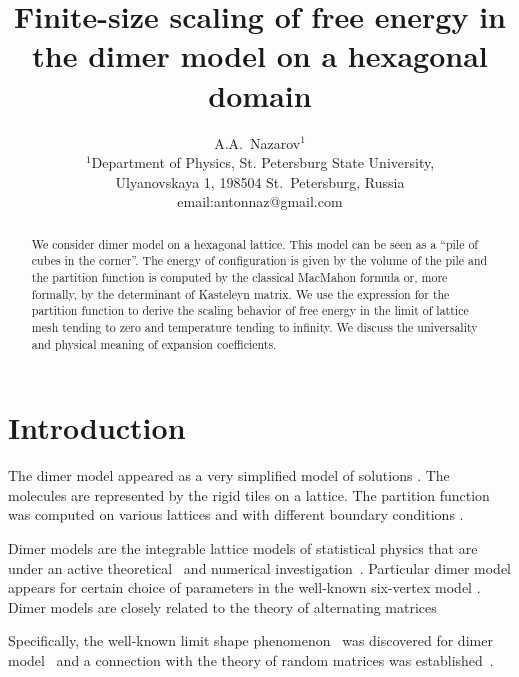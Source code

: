 \documentclass{article}
\begin{document}
\title{Finite-size scaling of free energy in the dimer model on a hexagonal domain}

\author{A.A.~Nazarov$^{1}$\\
{\small
  $^{1}$Department of Physics, St. Petersburg State University,} \\
{\small  Ulyanovskaya 1, 198504 St.~Petersburg, Russia}\\
\small{email:antonnaz@gmail.com}
}
\date{}
\maketitle

\begin{abstract}
  We consider dimer model on a hexagonal lattice. This model can be seen as a ``pile of cubes in the
  corner''. The energy of configuration is given by the volume of the pile and the partition
  function is computed by the classical MacMahon formula or, more formally, by the determinant of
  Kasteleyn matrix. We use the expression for the partition function to derive the scaling behavior
  of free energy in the limit of lattice mesh tending to zero and temperature tending to infinity.
  We discuss the universality and physical meaning of expansion coefficients.
\end{abstract}


\section*{Introduction}
\label{sec:introduction}
The dimer model appeared as a very simplified model of solutions \cite{Fowler-1937}. The molecules
are represented by the rigid tiles on a lattice. The partition function was computed on various
lattices and with different boundary conditions \cite{doi:10.1080/14786436108243366,
  P.W-1961,kenyon2009lectures}.

Dimer models are the integrable lattice models of statistical physics that are under an active
theoretical~\cite{zj2000,ferrari} and numerical
investigation~\cite{ks2018}. Particular dimer model appears for certain choice
of parameters in the well-known six-vertex model  \cite{pronko2017thesis}. Dimer models are
closely related to the theory of alternating matrices \cite{elkies1992alternating1,elkies1992alternating2}

Specifically, the well-known limit shape phenomenon~\cite{vershik1977kerov} was discovered for dimer
model~\cite{kenyon2006dimers} and a connection with the theory of random matrices was
established~\cite{johansson2002non}.
\end{document}
